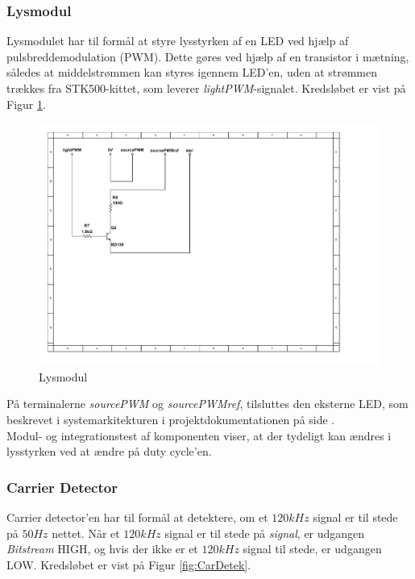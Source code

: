 \newpage

\subsubsection{Lysmodul}
Lysmodulet har til formål at styre lysstyrken af en LED ved hjælp af pulsbreddemodulation (PWM). Dette gøres ved hjælp af en transistor\cite{lib:BD139} i mætning, således at middelstrømmen kan styres igennem LED'en, uden at strømmen trækkes fra STK500-kittet, som leverer \textit{lightPWM}-signalet. Kredsløbet er vist på Figur \ref{fig:Lysmodul-kredslob}.\\

\begin{figure}[h]
	\centering
	\includegraphics[scale=0.8, trim=50 250 440 60, clip=true]{../Projektdokumentation/HardwareDesign/Diagrammer/Lysmodul.pdf}
	\caption{Lysmodul}
	\label{fig:Lysmodul-kredslob}
\end{figure}

På terminalerne \textit{sourcePWM} og \textit{sourcePWMref}, tilsluttes den eksterne LED\cite{lib:LED}, som beskrevet i systemarkitekturen i projektdokumentationen på side \pageref{P-subsec:IBDX10Lys}.\\

Modul- og integrationstest af komponenten viser, at der tydeligt kan ændres i lysstyrken ved at ændre på duty cycle'en.\\

\newpage

\subsubsection{Carrier Detector}
Carrier detector'en har til formål at detektere, om et $120kHz$ signal er til stede på $50Hz$ nettet. Når et $120kHz$ signal er til stede på \textit{signal}, er udgangen \textit{Bitstream} HIGH, og hvis der ikke er et $120kHz$ signal til stede, er udgangen LOW. Kredsløbet er vist på Figur \ref{fig:CarDetek}.

